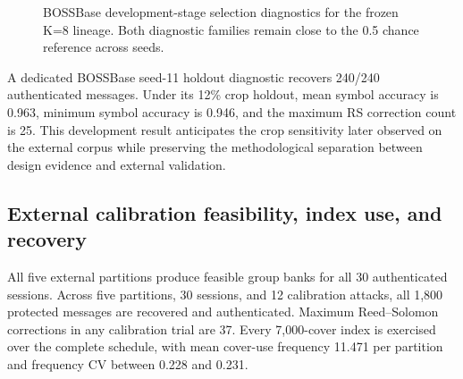 \begin{figure}[t]
\centering
{}
\caption{BOSSBase development-stage selection diagnostics for the frozen K=8 lineage. Both diagnostic families remain close to the 0.5 chance reference across seeds.}
\label{fig:boss-development-auc}
\end{figure}

A dedicated BOSSBase seed-11 holdout diagnostic recovers 240/240 authenticated messages. Under its 12\% crop holdout, mean symbol accuracy is 0.963, minimum symbol accuracy is 0.946, and the maximum RS correction count is 25. This development result anticipates the crop sensitivity later observed on the external corpus while preserving the methodological separation between design evidence and external validation.

\subsection{External calibration feasibility, index use, and recovery}

All five external partitions produce feasible group banks for all 30 authenticated sessions. Across five partitions, 30 sessions, and 12 calibration attacks, all 1,800 protected messages are recovered and authenticated. Maximum Reed--Solomon corrections in any calibration trial are 37. Every 7,000-cover index is exercised over the complete schedule, with mean cover-use frequency 11.471 per partition and frequency CV between 0.228 and 0.231.


